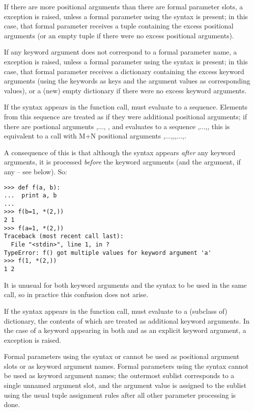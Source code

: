 If there are more positional arguments than there are formal parameter
slots, a  exception is raised, unless a formal
parameter using the syntax  is present; in this
case, that formal parameter receives a tuple containing the excess
positional arguments (or an empty tuple if there were no excess
positional arguments).

If any keyword argument does not correspond to a formal parameter
name, a  exception is raised, unless a formal
parameter using the syntax  is present; in this
case, that formal parameter receives a dictionary containing the
excess keyword arguments (using the keywords as keys and the argument
values as corresponding values), or a (new) empty dictionary if there
were no excess keyword arguments.

If the syntax  appears in the function call,
 must evaluate to a sequence.  Elements from this
sequence are treated as if they were additional positional arguments;
if there are postional arguments ,..., , and
 evaluates to a sequence ,...,, this
is equivalent to a call with M+N positional arguments
,...,,,...,.

A consequence of this is that although the  syntax
appears \emph{after} any keyword arguments, it is processed
\emph{before} the keyword arguments (and the
 argument, if any -- see below).  So:

\begin{verbatim}
>>> def f(a, b):
...  print a, b
...
>>> f(b=1, *(2,))
2 1
>>> f(a=1, *(2,))
Traceback (most recent call last):
  File "<stdin>", line 1, in ?
TypeError: f() got multiple values for keyword argument 'a'
>>> f(1, *(2,))
1 2
\end{verbatim}

It is unusual for both keyword arguments and the
 syntax to be used in the same call, so in practice
this confusion does not arise.

If the syntax  appears in the function call,
 must evaluate to a (subclass of) dictionary, the
contents of which are treated as additional keyword arguments.  In the
case of a keyword appearing in both  and as an
explicit keyword argument, a  exception is
raised.

Formal parameters using the syntax  or
 cannot be used as positional argument slots or
as keyword argument names.  Formal parameters using the syntax
 cannot be used as keyword argument names; the
outermost sublist corresponds to a single unnamed argument slot, and
the argument value is assigned to the sublist using the usual tuple
assignment rules after all other parameter processing is done.

